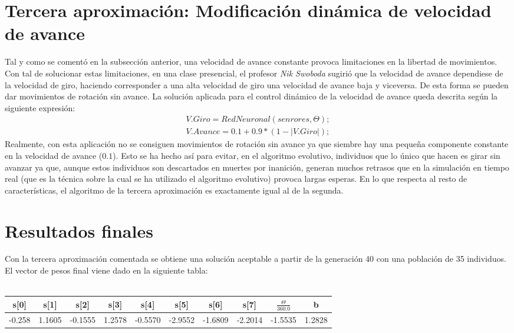 \documentclass[12pt,spanish]{article}
\begin{document}
\section{Tercera aproximación: Modificación dinámica de velocidad de avance}
Tal y como se comentó en la subsección anterior, una velocidad de avance constante provoca limitaciones en la libertad de movimientos. Con tal de solucionar estas limitaciones, en una clase presencial, el profesor  \textit{Nik Swoboda} sugirió que la velocidad de avance dependiese de la velocidad de giro, haciendo corresponder a una alta velocidad de giro una velocidad de avance baja y viceversa. De esta forma se pueden dar movimientos de rotación sin avance. La solución aplicada para el control dinámico de la velocidad de avance queda descrita según la siguiente expresión:\\
\begin{eqnarray}
	V.Giro = RedNeuronal(senrores,\Theta);\\
	V.Avance = 0.1+0.9*(1-|V.Giro|);
\end{eqnarray}
Realmente, con esta aplicación no se consiguen movimientos de rotación sin avance ya que siembre hay una pequeña componente constante en la velocidad de avance ($0.1$). Esto se ha hecho así para evitar, en el algoritmo evolutivo, individuos que lo único que hacen es girar sin avanzar ya que, aunque estos individuos son descartados en muertes por inanición, generan muchos retrasos que en la simulación en tiempo real (que es la técnica sobre la cual se ha utilizado el algoritmo evolutivo) provoca largas esperas.
En lo que respecta al resto de características, el algoritmo de la tercera aproximación es exactamente igual al de la segunda.
\section{Resultados finales}
Con la tercera aproximación comentada se obtiene una solución aceptable a partir de la generación 40 con una población de 35 individuos. El vector de pesos final viene dado en la siguiente tabla:\\
\\
\begin{tabular}{|c|c|c|c|c|c|c|c|c|c|}
\hline
\textbf{s[0]} & \textbf{s[1]} & \textbf{s[2]} & \textbf{s[3]} & \textbf{s[4]} & \textbf{s[5]} & \textbf{s[6]} & \textbf{s[7]} & \textbf{$\frac{\Theta}{360.0}$} & b\\
\hline
-0.258 &  1.1605 &  -0.1555 &  1.2578 &  -0.5570 &  -2.9552 &  -1.6809 &  -2.2014 &  -1.5535 &  1.2828\\
\hline
\end{tabular}
\end{document}
